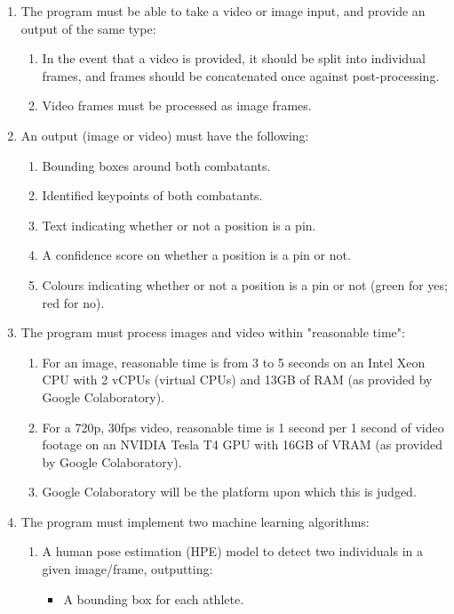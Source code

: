 \documentclass[a4paper, oneside, 11pt]{article}
\begin{document}
\begin{enumerate}
    \item The program must be able to take a video or image input, and provide an output of the same type:
    \begin{enumerate}
        \item In the event that a video is provided, it should be split into individual frames, and frames should be concatenated once against post-processing.
        \item Video frames must be processed as image frames.
    \end{enumerate}
    \item An output (image or video) must have the following:
    \begin{enumerate}
        \item Bounding boxes around both combatants.
        \item Identified keypoints of both combatants.
        \item Text indicating whether or not a position is a pin.
        \item A confidence score on whether a position is a pin or not.
        \item Colours indicating whether or not a position is a pin or not (green for yes; red for no).
    \end{enumerate} 
    \item The program must process images and video within "reasonable time":
    \begin{enumerate}
        \item For an image, reasonable time is from 3 to 5 seconds on an Intel Xeon CPU with 2 vCPUs (virtual CPUs) and 13GB of RAM (as provided by Google Colaboratory).
        \item For a 720p, 30fps video, reasonable time is 1 second per 1 second of video footage on an NVIDIA Tesla T4 GPU with 16GB of VRAM (as provided by Google Colaboratory).
        \item Google Colaboratory will be the platform upon which this is judged.
    \end{enumerate}
    \item The program must implement two machine learning algorithms:
    \begin{enumerate}
        \item A human pose estimation (HPE) model to detect two individuals in a given image/frame, outputting:
        \begin{itemize}
            \item A bounding box for each athlete.

\end{itemize}
\end{enumerate}
\end{enumerate}
\end{document}
